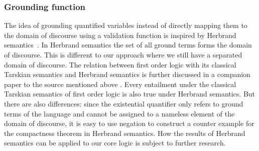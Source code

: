 % 
% 

\subsubsection{Grounding function}
The idea of grounding quantified variables instead of directly mapping them to the domain of discourse using a validation function is inspired by Herbrand semantics~\cite{herbrandLogic}.
In Herbrand semantics the set of all ground terms forms the domain of discourse. This is different to our approach where we still have a separated domain of discourse. The relation
between first order logic with its classical Tarskian semantics and Herbrand semantics is further discussed in a companion paper to the source mentioned above \cite{herbrand}.
Every entailment under the classical Tarskian semantics of first order logic is also true under Herbrand semantics. But there are also differences: since 
the existential quantifier only refers to ground terms of the language and cannot be assigned to a nameless element of the domain of discourse, 
it is easy to use negation to construct a counter example for 
the compactness theorem in
Herbrand semantics. How the results of Herbrand semantics can be applied to our core logic is subject to further research.


